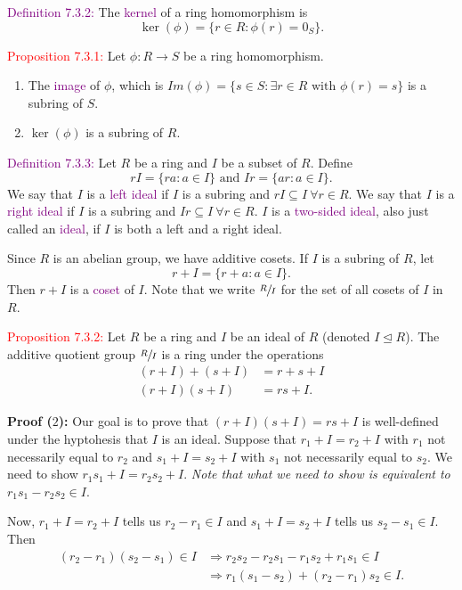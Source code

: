 \documentclass{article}
\begin{document}
\textcolor{purple}{Definition 7.3.2:} The \textcolor{purple}{kernel} of a ring homomorphism is
\[
    \ker{(\phi)} = \{r \in R: \phi(r) = 0_S\}.
\]

\textcolor{red}{Proposition 7.3.1:} Let $\phi:R \longrightarrow S$ be a ring homomorphism.
\begin{enumerate}
    \item The \textcolor{purple}{image} of $\phi$, which is $Im(\phi) = \{s \in S: \exists r \in R \text{ with } \phi(r)=s\}$ is a subring 
    of $S$.
    \item $\ker{(\phi)}$ is a subring of $R$.
\end{enumerate}

\textcolor{purple}{Definition 7.3.3:} Let $R$ be a ring and $I$ be a subset of $R$. Define 
\[
    rI=\{ra: a \in I\} \text{ and } Ir = \{ar: a \in I\}.
\]
We say that $I$ is a \textcolor{purple}{left ideal} if $I$ is a subring and $rI \subseteq I \ \forall r \in R$. We say that $I$ is a 
\textcolor{purple}{right ideal} if $I$ is a subring and $Ir \subseteq I \ \forall r \in R$. $I$ is a \textcolor{purple}{two-sided ideal}, 
also just called an \textcolor{purple}{ideal}, if $I$ is both a left and a right ideal.

Since $R$ is an abelian group, we have additive cosets. If $I$ is a subring of $R$, let 
\[
    r + I = \{r + a: a \in I\}.
\]
Then $r + I$ is a \textcolor{purple}{coset} of $I$. Note that we write $\sfrac{R}{I}$ for the set of all cosets of $I$ in $R$.

\textcolor{red}{Proposition 7.3.2:} Let $R$ be a ring and $I$ be an ideal of $R$ (denoted $I \trianglelefteq R$). The additive quotient 
group $\sfrac{R}{I}$ is a ring under the operations
\begin{align}
    (r+I)+(s+I) &= r+s+I \\
    (r+I)(s+I)&=rs+I.
\end{align}

\textbf{Proof ($2$):} Our goal is to prove that $(r+I)(s+I)=rs+I$ is well-defined under the hyptohesis that $I$ is an ideal. Suppose that 
$r_1 + I=r_2+I$ with $r_1$ not necessarily equal to $r_2$ and $s_1 + I=s_2+I$ with $s_1$ not necessarily equal to $s_2$. We need to show 
$r_1s_1+I=r_2s_2+I$. \textit{Note that what we need to show is equivalent to $r_1s_1-r_2s_2 \in I$}.

Now, $r_1+I=r_2+I$ tells us $r_2-r_1 \in I$ and $s_1+I=s_2+I$ tells us $s_2-s_1 \in I$. Then
\begin{align*}
    (r_2-r_1)(s_2-s_1) \in I &\Longrightarrow r_2s_2-r_2s_1-r_1s_2+r_1s_1 \in I \\
    &\Longrightarrow r_1(s_1-s_2)+(r_2-r_1)s_2 \in I.
\end{align*}
\end{document}
